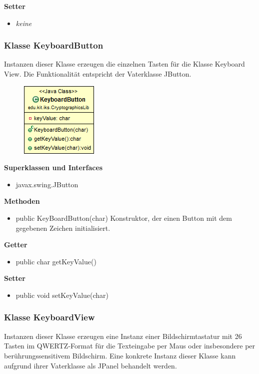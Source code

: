 \documentclass{article}
\begin{document}
      \textbf{Setter}
      \begin{itemize}
        \item \textit{keine}
      \end{itemize}
	
	\subsubsection{Klasse KeyboardButton}
	  Instanzen dieser Klasse erzeugen die einzelnen Tasten für die Klasse Keyboard View. Die Funktionalität entspricht der Vaterklasse JButton.
	
      \begin{figure}[H]
        \centering
        \includegraphics{resources/edu-kit-iks-CryptographicsLib-KeyboardButton}
      \end{figure}
	
      \textbf{Superklassen und Interfaces}
      \begin{itemize}
        \item javax.swing.JButton
      \end{itemize}
	
      \textbf{Methoden}
      \begin{itemize}
        \item public KeyBoardButton(char) \newline
          Konstruktor, der einen Button mit dem gegebenen Zeichen initialisiert.
      \end{itemize}
      
      \textbf{Getter}
      \begin{itemize}
		\item public char getKeyValue()
      \end{itemize}
      
      \textbf{Setter}
      \begin{itemize}
        \item public void setKeyValue(char)
      \end{itemize}
	
	\subsubsection{Klasse KeyboardView}
	  Instanzen dieser Klasse erzeugen eine Instanz einer Bildschirmtastatur mit 26 Tasten im QWERTZ-Format für die Texteingabe per Maus oder insbesondere per berührungssensitivem Bildschirm. Eine konkrete Instanz dieser Klasse kann aufgrund ihrer Vaterklasse als JPanel behandelt werden.
	
\end{document}

